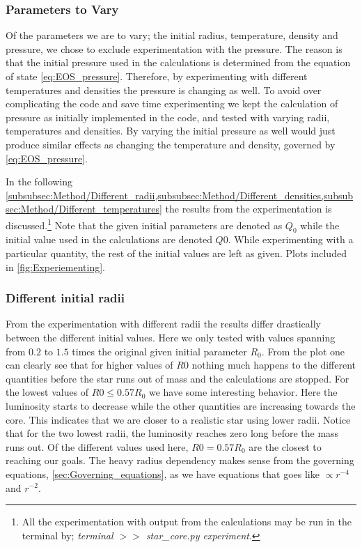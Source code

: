 \documentclass[11pt,a4paper,twocolumn,titlepage]{article}
\begin{document}
\subsubsection{Parameters to Vary}
Of the parameters we are to vary; the initial radius, temperature, density and pressure, we chose to exclude experimentation with the pressure. The reason is that the initial pressure used in the calculations is determined from the equation of state \cref{eq:EOS_pressure}. Therefore, by experimenting with different temperatures and densities the pressure is changing as well. To avoid over complicating the code and save time experimenting we kept the calculation of pressure as initially implemented in the code, and tested with varying radii, temperatures and densities. By varying the initial pressure as well would just produce similar effects as changing the temperature and density, governed by \cref{eq:EOS_pressure}.

In the following \cref{subsubsec:Method/Different_radii,subsubsec:Method/Different_densities,subsubsec:Method/Different_temperatures} the results from the experimentation is discussed.\footnote{All the experimentation with output from the calculations may be run in the terminal by;  \textit{terminal $>>$ {star\_core.py} experiment}.} Note that the given initial parameters are denoted as $Q_0$ while the initial value used in the calculations are denoted $Q0$. While experimenting with a particular quantity, the rest of the initial values are left as given. Plots included in \cref{fig:Experiementing}.

\subsubsection{Different initial radii} \label{subsubsec:Method/Different_radii}
From the experimentation with different radii the results differ drastically between the different initial values. Here we only tested with values spanning from $0.2$ to $1.5$ times the original given initial parameter $R_0$. From the plot one can clearly see that for higher values of $R0$ nothing much happens to the different quantities before the star runs out of mass and the calculations are stopped. For the lowest values of $R0\leq 0.57R_0$ we have some interesting behavior. Here the luminosity starts to decrease while the other quantities are increasing towards the core. This indicates that we are closer to a realistic star using lower radii. Notice that for the two lowest radii, the luminosity reaches zero long before the mass runs out. Of the different values used here, $R0 = 0.57R_0$ are the closest to reaching our goals. The heavy radius dependency makes sense from the governing equations, \cref{sec:Governing_equations}, as we have equations that goes like $\propto r^{-4}$ and $r^{-2}$.
\end{document}
